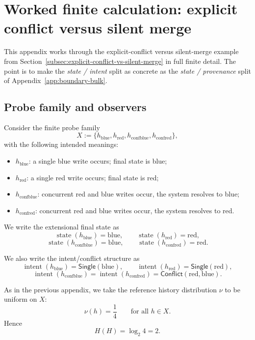 \documentclass[11pt,twoside]{article}
\theoremstyle{definition}
\newcommand{\blue}{\mathrm{blue}}
\newcommand{\red}{\mathrm{red}}
\newcommand{\conf}{\mathrm{conf}}
\begin{document}
\section{Worked finite calculation: explicit conflict versus silent merge}
\label{app:conflict-vs-silent-merge}

This appendix works through the explicit-conflict versus silent-merge example from Section~\ref{subsec:explicit-conflict-vs-silent-merge} in full finite detail. The point is to make the \emph{state / intent} split as concrete as the \emph{state / provenance} split of Appendix~\ref{app:boundary-bulk}.

\subsection{Probe family and observers}
\label{app:conflict-setup}

Consider the finite probe family
\[
  X
  :=
  \{
    h_{\blue},
    h_{\red},
    h_{\conf\blue},
    h_{\conf\red}
  \},
\]
with the following intended meanings:

\begin{itemize}[leftmargin=*]
  \item \(h_{\blue}\): a single blue write occurs; final state is blue;
  \item \(h_{\red}\): a single red write occurs; final state is red;
  \item \(h_{\conf\blue}\): concurrent red and blue writes occur, the system resolves to blue;
  \item \(h_{\conf\red}\): concurrent red and blue writes occur, the system resolves to red.
\end{itemize}

We write the extensional final state as
\[
  \operatorname{state}(h_{\blue})=\blue,
  \qquad
  \operatorname{state}(h_{\red})=\red,
\]
\[
  \operatorname{state}(h_{\conf\blue})=\blue,
  \qquad
  \operatorname{state}(h_{\conf\red})=\red.
\]

We also write the intent/conflict structure as
\[
  \operatorname{intent}(h_{\blue})=\mathsf{Single}(\blue),
  \qquad
  \operatorname{intent}(h_{\red})=\mathsf{Single}(\red),
\]
\[
  \operatorname{intent}(h_{\conf\blue})
  =
  \operatorname{intent}(h_{\conf\red})
  =
  \mathsf{Conflict}(\red,\blue).
\]

As in the previous appendix, we take the reference history distribution \(\nu\) to be uniform on \(X\):
\[
  \nu(h)=\frac14
  \qquad
  \text{for all } h\in X.
\]
Hence
\[
  H(H)=\log_2 4 = 2.
\]
\end{document}
